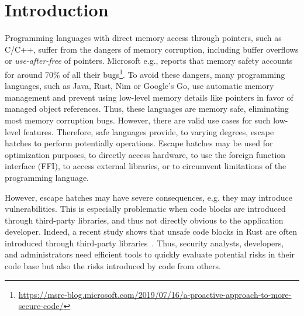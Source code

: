 \section{Introduction}
\label{sec:intro}

Programming languages with direct memory access through pointers, such as C/C++, suffer from the dangers of memory corruption, including buffer overflows \cite{alnaeli2017, larochelle2001} or \textit{use-after-free} of pointers.
Microsoft e.g., reports that memory safety accounts for around 70\% of all their bugs\footnote{\url{https://msrc-blog.microsoft.com/2019/07/16/a-proactive-approach-to-more-secure-code/}}. 
To avoid these dangers, many programming languages, such as Java, Rust, Nim or Google's Go, use automatic memory management and  prevent using low-level memory details like pointers in favor of managed object references.
Thus, these languages are memory safe, eliminating most memory corruption bugs. 
However, there are valid use cases for such low-level features.
%
%
%
Therefore, safe languages provide, to varying degrees, escape hatches to perform potentially \unsafe{} operations.
Escape hatches may be used for optimization purposes, to directly access hardware, to use the foreign function interface (FFI), to access external libraries, or to circumvent limitations of the programming language. 

However, escape hatches may have severe consequences, e.g. they may introduce vulnerabilities.
This is especially problematic when \unsafe{} code blocks are introduced through third-party libraries, and thus not directly obvious to the application developer. 
Indeed, a recent study shows that unsafe code blocks in Rust are often introduced through third-party libraries~\cite{evans2020}. 
Thus, security analysts, developers, and administrators need efficient tools to quickly evaluate potential risks in their code base but also the risks introduced by code from others.


